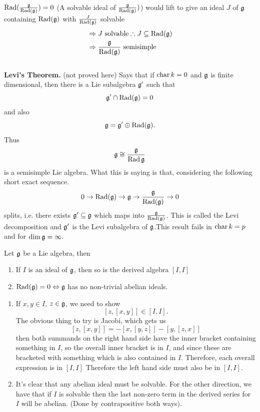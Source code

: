 \documentclass{article}
\begin{document}
\begin{remark*}
    $\operatorname{Rad}(\frac{\mathfrak{g}}{\operatorname{Rad}(\mathfrak{g})})=0$ (A solvable ideal of $\frac{\mathfrak{g}}{\operatorname{Rad}(\mathfrak{g})})$) would lift to give an ideal $J$ of $\mathfrak{g}$ containing $\operatorname{Rad}(\mathfrak{g})$ with $\frac{J}{\operatorname{Rad}(\mathfrak{g})}$ solvable
    \begin{align*}
        &\Rightarrow J \text{ solvable} \therefore J \subseteq \operatorname{Rad}(\mathfrak{g})\\
        &\Rightarrow \frac{\mathfrak{g}}{\operatorname{Rad}(\mathfrak{g})} \text{  semisimple}
    \end{align*}\hspace{0.1cm}\\
    \textbf{Levi's Theorem. }(not proved here) Says that if $\operatorname{char} k = 0$ and $\mathfrak{g}$ is finite dimensional, then there is a Lie subalgebra $\mathfrak{g}'$ such that \[ \mathfrak{g}' \cap \operatorname{Rad}(\mathfrak{g})=0\] and also \[\mathfrak{g} = \mathfrak{g}' \oplus \operatorname{Rad}(\mathfrak{g}).\] Thus \[ \mathfrak{g} \cong \frac{\mathfrak{g}}{\operatorname{Rad}{\mathfrak{g}}} \] is a semisimple Lie algebra. What this is saying is that, considering the following short exact sequence. \[ 0 \rightarrow \operatorname{Rad}(\mathfrak{g}) \rightarrow \mathfrak{g} \rightarrow \frac{\mathfrak{g}}{\operatorname{Rad}(\mathfrak{g})} \rightarrow 0 \] splits, i.e. there exists $\mathfrak{g}' \subseteq \mathfrak{g}$ which maps into $\frac{\mathfrak{g}}{\operatorname{Rad}(\mathfrak{g})}$. This is called the Levi decomposition and $\mathfrak{g}'$ is the Levi subalgebra of $\mathfrak{g}$.\gap This result fails in $\operatorname{char} k = p$ and for $\dim \mathfrak{g} = \infty$.
\end{remark*}
\begin{fancylem}{}
    Let $\mathfrak{g}$ be a Lie algebra, then \begin{enumerate}
        \item If $I$ is an ideal of $\mathfrak{g}$, then so is the derived algebra $[I,I]$
        \item $\operatorname{Rad}(\mathfrak{g})=0 \Leftrightarrow \mathfrak{g}$ has no non-trivial abelian ideals.
    \end{enumerate}
\end{fancylem}
\proof \hspace{0.1cm} \begin{enumerate}
    \item If $x, y \in I$, $z \in \mathfrak{g}$, we need to show \[ [z,[x,y]] \in [I,I]. \] The obvious thing to try is Jacobi, which gets us \[ [z,[x,y]] = -[x,[y,z]] - [y,[z,x]] \] then both summands on the right hand side have the inner bracket containing something in $I$, so the overall inner bracket is in $I$, and since these are bracketed with something which is also contained in $I$. Therefore, each overall expression is in $[I,I]$ Therefore the left hand side must also be in $[I,I]$.
    \item It's clear that any abelian ideal must be solvable. For the other direction, we have that if $I$ is solvable then the last non-zero term in the derived series for $I$ will be abelian. (Done by contrapositive both ways).
\end{enumerate}
\end{document}
